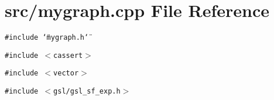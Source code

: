 \section{src/mygraph.cpp File Reference}
\label{mygraph_8cpp}
{\tt \#include \char`\"{}mygraph.h\char`\"{}}\par
{\tt \#include $<$cassert$>$}\par
{\tt \#include $<$vector$>$}\par
{\tt \#include $<$gsl/gsl\_\-sf\_\-exp.h$>$}\par
